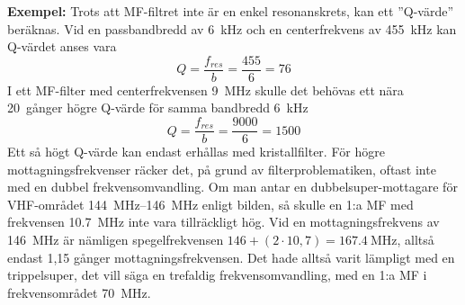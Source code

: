 \textbf{Exempel:}
Trots att MF-filtret inte är en enkel resonanskrets, kan ett ''Q-värde''
beräknas.
Vid en passbandbredd av \SI{6}{\kilo\hertz} och en centerfrekvens av
\SI{455}{\kilo\hertz} kan Q-värdet anses vara
\[ Q = \frac{f_{\textit{res}}}{b} = \frac{455}{6} = 76 \]
I ett MF-filter med centerfrekvensen \SI{9}{\mega\hertz} skulle det behövas ett
nära 20~gånger högre Q-värde för samma bandbredd \SI{6}{\kilo\hertz}
\[ Q = \frac{f_{\textit{res}}}{b} = \frac{9000}{6} = 1500 \]
Ett så högt Q-värde kan endast erhållas med kristallfilter.
För högre mottagningsfrekvenser räcker det, på grund av filterproblematiken,
oftast inte med en dubbel frekvensomvandling.
Om man antar en dubbelsuper-mottagare för VHF-området
\SIrange{144}{146}{\mega\hertz} enligt bilden, så skulle en 1:a MF med
frekvensen \SI{10,7}{\mega\hertz} inte vara tillräckligt hög.
Vid en mottagningsfrekvens av \SI{146}{\mega\hertz} är nämligen spegelfrekvensen
\(146 + (2 \cdot 10,7) = \SI{167,4}{\mega\hertz}\), alltså endast 1,15 gånger
mottagningsfrekvensen.
Det hade alltså varit lämpligt med en trippelsuper, det vill säga en trefaldig
frekvensomvandling, med en 1:a MF i frekvensområdet \SI{70}{\mega\hertz}.
